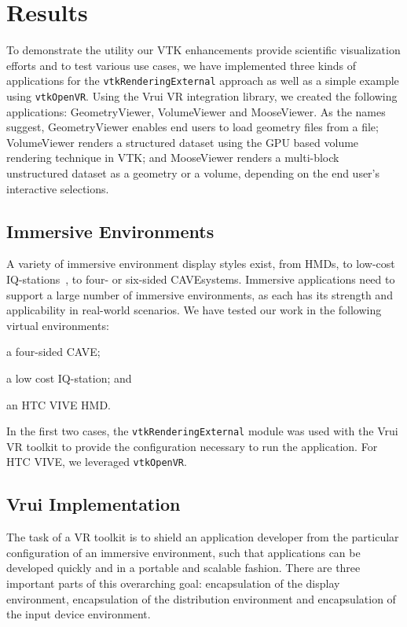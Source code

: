 \section{Results}

To demonstrate the utility our VTK enhancements provide scientific
visualization efforts and to test various use cases, we have implemented three kinds of
applications for the \texttt{vtkRenderingExternal} approach as well as
a simple example using \texttt{vtkOpenVR}.
Using the Vrui VR integration library, we created the following applications:
GeometryViewer, VolumeViewer and MooseViewer.
As the names suggest, GeometryViewer enables end users to load geometry files from a file; VolumeViewer renders a structured dataset using the GPU based volume rendering technique in VTK; and MooseViewer renders a multi-block unstructured dataset as a geometry or a volume, depending on the end user's interactive selections.

\subsection{Immersive Environments}

A variety of immersive environment display styles exist, from HMDs, to low-cost IQ-stations~\cite{Sherman:2010}, to four- or six-sided CAVE\texttrademark systems. Immersive applications need to support a large number of immersive environments, as each has its strength and applicability in real-world scenarios. We have tested our work in the following virtual environments: 

\begin{compactitem}
\item a four-sided CAVE\texttrademark;
\item a low cost IQ-station; and 
\item an HTC VIVE HMD.
\end{compactitem}

In the first two cases, the \texttt{vtkRenderingExternal} module was used with the Vrui VR toolkit to provide the configuration necessary to run the application. For HTC VIVE, we leveraged \texttt{vtkOpenVR}. 

\subsection{Vrui Implementation}

The task of a VR toolkit is to shield an application developer from the particular configuration of an immersive environment, such that applications can be developed quickly and in a portable and scalable fashion. There are three important parts of this overarching goal: encapsulation of the display environment, encapsulation of the distribution environment and encapsulation of the input device environment.


